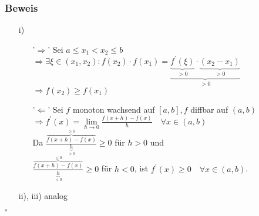 \documentclass[12pt, titlepage]{article}
\renewcommand{\>}{\rightarrow}
\renewcommand{\*}{\cdot}
\begin{document}
	\subsubsection*{Beweis}
	\begin{itemize}
		\item[i)] \begin{itemize}
			\item['$\Rightarrow$'] Sei $a\leq x_1<x_2\leq b$\\
			$\Rightarrow\exists\xi\in(x_1,x_2)\colon f(x_2)\*f(x_1)=\underbrace{\underbrace{f^\prime(\xi)}_{>0}\*\underbrace{(x_2-x_1)}_{>0}}_{>0}$\\
			$\Rightarrow f(x_2)\geq f(x_1)$
			\item['$\Leftarrow$'] Sei $f$ monoton wachsend auf $[a,b], f$ diffbar auf $(a,b)$\\
			$\Rightarrow f^\prime(x)=\lim\limits_{h\>0}\frac{f(x+h)-f(x)}{h}\quad\forall x\in(a,b)$\\
			Da $\frac{\overbrace{f(x+h)-f(x)}^{\geq0}}{\underbrace{h}_{>0}}\geq0$ für $h>0$ und\\
			$\frac{\overbrace{f(x+h)-f(x)}^{\leq0}}{\underbrace{h}_{<0}}\geq0$ für $h<0$, ist $f^\prime(x)\geq0\quad\forall x\in(a,b)$.
		\end{itemize}
		\item[ii), iii)] analog
	\end{itemize}
	\hfill$\square$
\end{document}
